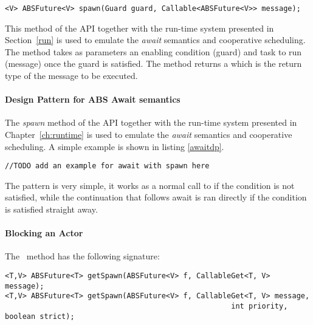 \begin{lstlisting}
<V> ABSFuture<V> spawn(Guard guard, Callable<ABSFuture<V>> message);
\end{lstlisting}

This method of the API together with the run-time system presented in Section~\ref{run} is used to emulate the \textit{await} semantics and cooperative scheduling. The method takes as parameters an enabling condition (guard) and task to run (message) once the guard is satisfied. The method returns a \future which is the return type of the message to be executed. 

\paragraph{Design Pattern for ABS Await semantics}
The \textit{spawn} method of the API together with the run-time system presented in Chapter~\ref{ch:runtime} is used to emulate the \textit{await} semantics and cooperative scheduling. A simple example is shown in listing \ref{awaitdp}. 

\begin{lstlisting}[label=awaitdp]
//TODO add an example for await with spawn here
\end{lstlisting}

The pattern is very simple, it works as a normal call to \spawn if the condition is not satisfied, while the continuation that follows await is ran directly if the condition is satisfied straight away.


\paragraph{Blocking an Actor}
The \gspawn ~method has the following signature:

\begin{lstlisting}
<T,V> ABSFuture<T> getSpawn(ABSFuture<V> f, CallableGet<T, V> message);
<T,V> ABSFuture<T> getSpawn(ABSFuture<V> f, CallableGet<T, V> message, 
													int priority, boolean strict);
\end{lstlisting}

